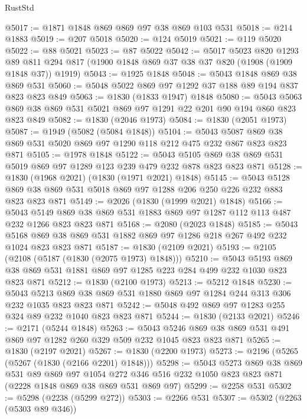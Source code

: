 \begin{lexlean}{RustStd}
\begin{coremodule}
@5017 := @1871 @1848 @869 @869 @97 @38 @869 @103 @531
@5018 := @214 @1883
@5019 := @207 @5018
@5020 := @124 @5019
@5021 := @119 @5020
@5022 := @88 @5021
@5023 := @87 @5022
@5042 := @5017
    @5023
    @820
    @1293
    @89
    @811
    @294
    @817
    (@1900 @1848 @869 @37 @38 @37 @820 (@1908 (@1909 @1848 @37)) @1919)
@5043 := @1925 @1848
@5048 := @5043 @1848 @869 @38 @869 @531
@5060 := @5048 @5022 @869 @97 @1292 @37 @188 @89 @194 @837 @823 @823 @849
@5063 := @1830 (@1833 @1947) @1848
@5080 := @5043 @5063 @869 @38 @869 @531 @5021 @869 @97 @1291 @22 @201 @90 @194 @860 @823 @823 @849
@5082 := @1830 (@2046 @1973)
@5084 := @1830 (@2051 @1973)
@5087 := @1949 (@5082 (@5084 @1848))
@5104 := @5043 @5087 @869 @38 @869 @531 @5020 @869 @97 @1290 @118 @212 @475 @232 @867 @823 @823 @871
@5105 := @1978 @1848
@5122 := @5043 @5105 @869 @38 @869 @531 @5019 @869 @97 @1289 @123 @239 @479 @232 @878 @823 @823 @871
@5128 := @1830 (@1968 @2021) (@1830 (@1971 @2021) @1848)
@5145 := @5043 @5128 @869 @38 @869 @531 @5018 @869 @97 @1288 @206 @250 @226 @232 @883 @823 @823 @871
@5149 := @2026 (@1830 (@1999 @2021) @1848)
@5166 := @5043
    @5149
    @869
    @38
    @869
    @531
    @1883
    @869
    @97
    @1287
    @112
    @113
    @487
    @232
    @1266
    @823
    @823
    @871
@5168 := @2080 (@2023 @1848)
@5185 := @5043
    @5168
    @869
    @38
    @869
    @531
    @1882
    @869
    @97
    @1286
    @218
    @267
    @492
    @232
    @1024
    @823
    @823
    @871
@5187 := @1830 (@2109 @2021)
@5193 := @2105 (@2108 (@5187 (@1830 (@2075 @1973) @1848)))
@5210 := @5043
    @5193
    @869
    @38
    @869
    @531
    @1881
    @869
    @97
    @1285
    @223
    @284
    @499
    @232
    @1030
    @823
    @823
    @871
@5212 := @1830 (@2100 @1973)
@5213 := @5212 @1848
@5230 := @5043
    @5213
    @869
    @38
    @869
    @531
    @1880
    @869
    @97
    @1284
    @244
    @313
    @306
    @232
    @1035
    @823
    @823
    @871
@5242 := @5048 @492 @869 @97 @1283 @255 @324 @89 @232 @1040 @823 @823 @871
@5244 := @1830 (@2133 @2021)
@5246 := @2171 (@5244 @1848)
@5263 := @5043 @5246 @869 @38 @869 @531 @491 @869 @97 @1282 @260 @329 @509 @232 @1045 @823 @823 @871
@5265 := @1830 (@2197 @2021)
@5267 := @1830 (@2200 @1973)
@5273 := @2196 (@5265 (@5267 (@1830 (@2166 @2201) @1848)))
@5298 := @5043
    @5273
    @869
    @38
    @869
    @531
    @89
    @869
    @97
    @1054
    @272
    @346
    @516
    @232
    @1050
    @823
    @823
    @871
    (@2228 @1848 @869 @38 @869 @531 @869 @97)
@5299 := @2258 @531
@5302 := @5298 (@2238 (@5299 @272))
@5303 := @2266 @531
@5307 := @5302 (@2263 (@5303 @89 @346))

\end{coremodule}
\end{lexlean}

